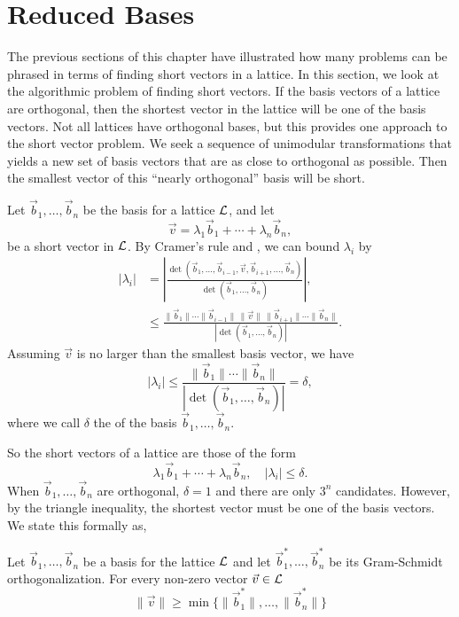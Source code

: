 \section{Reduced Bases}
\label{Lovasz:Basis:Sec}

The previous sections of this chapter have illustrated how many
problems can be phrased in terms of finding short vectors in a
lattice.  In this section, we look at the algorithmic problem of
finding short vectors.  If the basis vectors of a lattice are
orthogonal, then the shortest vector in the lattice will be one
of the basis vectors.  Not all lattices have orthogonal bases, but
this provides one approach to the short vector problem.  We seek a
sequence of unimodular transformations that
yields a new set of basis vectors that are as close to orthogonal as
possible.  Then the smallest vector of this ``nearly orthogonal''
basis will be short. 

Let $\vec{b}_1, \ldots, \vec{b}_n$ be the basis for a lattice ${\cal L}$, and
let 
\[
\vec{v} = \lambda_1 \vec{b}_1 + \cdots + \lambda_n \vec{b}_n,
\]
be a short vector in ${\cal L}$.  By Cramer's rule and
, we can bound $\lambda_i$ by 
\[
\begin{aligned}
  |\lambda_i| & = \left|\frac{\det(\vec{b}_1, \ldots, \vec{b}_{i-1},
\vec{v}, \vec{b}_{i+1}, \ldots, \vec{b}_n)}{\det(\vec{b}_1, \ldots,
\vec{b}_n)} \right|, \\
  & \le \frac{\|\vec{b}_1\| \cdots \|\vec{b}_{i-1}\|\, \|\vec{v}\|\,
\|\vec{b}_{i+1}\| \cdots \|\vec{b}_n\|}{\left|\det(\vec{b}_1, \ldots,
\vec{b}_n)\right| }.
\end{aligned}
\]
Assuming $\vec{v}$ is no larger than the smallest basis vector, we
have
\[
|\lambda_i | \le  \frac{\|\vec{b}_1\|
\cdots\|\vec{b}_n\|}{\left|\det(\vec{b}_1, \ldots, \vec{b}_n)\right|} = \delta,
\]
where we call $\delta$ the  of the basis
$\vec{b}_1, \ldots, \vec{b}_n$.

So the short vectors of a lattice are those of the form
\[
\lambda_1 \vec{b}_1 + \cdots + \lambda_n \vec{b}_n , \quad |\lambda_i|
\le \delta.
\]
When $\vec{b}_1, \ldots, \vec{b}_n$ are orthogonal, $\delta = 1$ and
there are only $3^n$ candidates.  However, by the triangle inequality,
the shortest vector must be one of the basis vectors.  We state this
formally as,

\begin{proposition} \label{Lat:Min:Vector:Prop}
Let $\vec{b}_1, \ldots, \vec{b}_n$ be a basis for the lattice ${\cal
L}$ and let $\vec{b}^{\ast}_1, \ldots, \vec{b}^{\ast}_n$ be its
Gram-Schmidt orthogonalization. For
every non-zero vector $\vec{v} \in {\cal L}$
\[
\|\vec{v}\| \ge \min \{ \|\vec{b}^{\ast}_1\|, \ldots,
\|\vec{b}^{\ast}_n\| \}
\]
\end{proposition}

